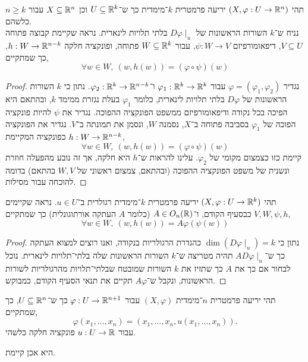 \question{}
\subquestion{}
תהי $(X, \varphi : U \to \mathbb{R}^n)$ יריעה פרמטרית $k$־מימדית כך ש־$U \subseteq \mathbb{R}^k$ וכן $X \subseteq \mathbb{R}^n$ עבור $n \ge k$ כלשהם. \\
נניח ש־$k$ השורות הראשונות של $D \varphi \mid_u$ בלתי תלויות לינארית.
נראה שקיימת קבוצה פתוחה $V \subseteq U$, דיפאומורפיזם $\psi : W \to V$, עבור $W \subseteq \mathbb{R}^k$ פתוחה, ופונקציה חלקה $h : W \to \mathbb{R}^{n - k}$, כך שמתקיים,
\[
	\forall w \in W,\ 
	(w, h(w)) = (\varphi \circ \psi)(w)
\]
\begin{proof}
	נגדיר $\varphi = (\varphi_1, \varphi_2)$ עבור $\varphi_1 : \mathbb{R}^k \to \mathbb{R}^k$ ו־$\varphi_2 : \mathbb{R}^k \to \mathbb{R}^{n - k}$.
	נתון כי $k$ השורות הראשונות של $D \varphi$ בלתי תלויות לינארית, כלומר $\varphi_1$ בעלת נגזרת ממימד $k$, ובהתאם היא הפיכה בכל נקודה ודיפאומורפיזם ממשפט הפונקציה ההפוכה.
	נגדיר את $\psi$ להיות פונקציה הפוכה של $\varphi_1$ בסביבה פתוחה ב־$X$, נסמנה $W$, ונסמן את תמונתה ב־$V$.
	נגדיר את הפונקציה $h : W \to \mathbb{R}^{n - k}$ כפונקציה המקיימת,
	\[
		\forall w \in W,\ 
		(w, h(w)) = (\varphi \circ \psi)(w)
	\]
	קיימת כזו כצמצום מקומי של $\varphi_2$.
	עלינו להראות ש־$h$ היא חלקה, אך זה נובע מהפעלה חוזרת ונשנית של משפט הפונקציה ההפוכה (ובהתאם, צמצום ראשוני של $W, V$ בהתאם) בדומה להוכחה עבור מסילות.
\end{proof}

\subquestion{}
תהי $(X, \varphi : U \to \mathbb{R}^k)$ יריעה פרמטרית $k$־מימדית רגולרית ב־$u \in U$.
נראה שקיימים $V, W, \psi, h$ כבסעיף הקודם, ו־$A \in O_n(\mathbb{R})$ (כלומר $A$ העתקה אורתוגונלית) כך שמתקיים,
\[
	\forall w \in W,\ 
	(w, h(w)) = A \varphi(\psi(w))
\]
\begin{proof}
	נתון כי $\dim(D\varphi \mid_u) = k$ כהגדרת הרגולריות בנקודה, ואנו רוצים למצוא העתקה כך ש־$A D\varphi \mid_u$ תהיה מטריצה ש־$k$ השורות הראשונות שלה בלתי־תלויות לינארית.
	נוכל לבחור אם כך את $A$ כך שתזיז את $k$ השורות שמובטח שבלתי־תלויות מהרגולריות לשורות הראשונות, ונקבל ש־$A \varphi$ תקיים את תנאי הסעיף הקודם, כמבוקש.
\end{proof}

\question{}
\subquestion{}
תהי יריעה פרמטרית $n$־מימדית $(X, \varphi)$ עבור $\varphi : U \to \mathbb{R}^{n + 1}$ כך ש־$U \subseteq \mathbb{R}^n$, כך שמתקיים,
\[
	\varphi(x_1, \ldots, x_n)
	= (x_1, \ldots, x_n, u(x_1, \ldots, x_n))
.\]
עבור $u : U \to \mathbb{R}$ פונקציה חלקה כלשהי.
\begin{solution}
	היא אכן קיימת.
\end{solution}

